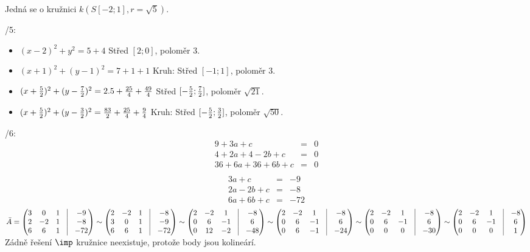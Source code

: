 Jedná se o kružnici $k(S[-2;1],r=\sqrt 5)$.

/5:
\begin{itemize}

\item $(x-2)^2+y^2 = 5+4$ Střed $[2;0]$, poloměr $3$.
\item $(x+1)^2+(y-1)^2 = 7+1+1$ Kruh: Střed $[-1;1]$, poloměr $3$.
\item $(x+\frac 5 2)^2+(y-\frac 7 2)^2 = 2.5+\frac{25}4+\frac{49}4$ Střed $[-\frac 52;\frac 72]$, poloměr $\sqrt{21}$.
\item $(x+\frac 5 2)^2+(y-\frac 3 2)^2 = \frac{83}2+\frac{25}4+\frac 9 4$ Kruh: Střed $[-\frac 5 2;\frac 3 2]$, poloměr $\sqrt{50}$.
\end{itemize}
/6:
\begin{eqnarray}
9+3a+c &=& 0 \\
4+2a+4-2b+c &=& 0 \\
36+6a+36+6b+c &=& 0 \\
\end{eqnarray}
\begin{eqnarray}
3a+c &=& -9 \\
2a-2b+c &=& -8 \\
6a+6b+c &=& -72 \\
\end{eqnarray}
 $ \bar{A} = \begin{pmatrix}
3 &0 &1 &\vline& -9 \\
2 &-2 &1 &\vline& -8 \\
6 &6 &1 &\vline& -72 \\
\end{pmatrix}
\sim
\begin{pmatrix}
2 &-2 &1 &\vline& -8 \\
3 &0 &1 &\vline& -9 \\
6 &6 &1 &\vline& -72 \\
\end{pmatrix}
\sim
\begin{pmatrix}
2 &-2 &1 &\vline& -8 \\
0 &6 &-1 &\vline& 6 \\
0 &12 &-2 &\vline& -48 \\
\end{pmatrix}
\sim
\begin{pmatrix}
2 &-2 &1 &\vline& -8 \\
0 &6 &-1 &\vline& 6 \\
0 &6 &-1 &\vline& -24 \\
\end{pmatrix}
\sim
\begin{pmatrix}
2 &-2 &1 &\vline& -8 \\
0 &6 &-1 &\vline& 6 \\
0 &0 &0 &\vline& -30 \\
\end{pmatrix}
\sim
\begin{pmatrix}
2 &-2 &1 &\vline& -8 \\
0 &6 &-1 &\vline& 6 \\
0 &0 &0 &\vline& 1 \\
\end{pmatrix}
 $
 Zádně řešení $\imp$ kružnice neexistuje, protože body jsou kolineárí.

